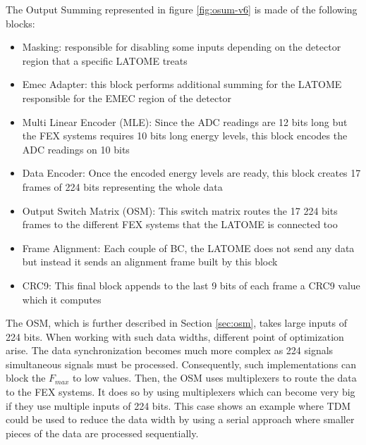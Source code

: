 The Output Summing represented in figure \ref{fig:osum-v6} is made of the following blocks:
\begin{itemize}
    \item Masking: responsible for disabling some inputs depending on the detector region that a specific LATOME treats
    \item Emec Adapter: this block performs additional summing for the LATOME responsible for the EMEC region of the detector
    \item Multi Linear Encoder (MLE): Since the ADC readings are 12 bits long but the FEX systems requires 10 bits long energy levels, this block encodes the ADC readings on 10 bits
    \item Data Encoder: Once the encoded energy levels are ready, this block creates 17 frames of 224 bits representing the whole data
    \item Output Switch Matrix (OSM): This switch matrix routes the 17 224 bits frames to the different FEX systems that the LATOME is connected too
    \item Frame Alignment: Each couple of BC, the LATOME does not send any data but instead it sends an alignment frame built by this block
    \item CRC9: This final block appends to the last 9 bits of each frame a CRC9 value which it computes
\end{itemize}

The OSM, which is further described in Section \ref{sec:osm}, takes large inputs of 224 bits. When working with such data widths, different point of optimization arise. The data synchronization becomes much more complex as 224 signals simultaneous signals must be processed. Consequently, such implementations can block the \(F_{max}\) to low values. 
Then, the OSM uses multiplexers to route the data to the FEX systems. It does so by using multiplexers which can become very big if they use multiple inputs of 224 bits. 
This case shows an example where TDM could be used to reduce the data width by using a serial approach where smaller pieces of the data are processed sequentially.
